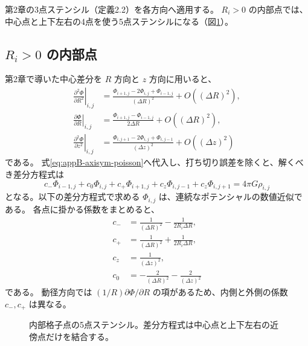 第2章の3点ステンシル（定義2.2）を各方向へ適用する。
$R_i>0$ の内部点では、中心点と上下左右の4点を使う5点ステンシルになる（図\ref{fig:appB-stencil}）。

\subsection{$R_i>0$ の内部点}

第2章で導いた中心差分を $R$ 方向と $z$ 方向に用いると、
\begin{align}
 \left.\frac{\partial^2\Phi}{\partial R^2}\right|_{i,j}&=\frac{\Phi_{i+1,j}-2\Phi_{i,j}+\Phi_{i-1,j}}{(\Delta R)^2}+O((\Delta R)^2),\label{eq:appB-drr}\\
 \left.\frac{\partial\Phi}{\partial R}\right|_{i,j}&=\frac{\Phi_{i+1,j}-\Phi_{i-1,j}}{2\Delta R}+O((\Delta R)^2),\label{eq:appB-dr}\\
 \left.\frac{\partial^2\Phi}{\partial z^2}\right|_{i,j}&=\frac{\Phi_{i,j+1}-2\Phi_{i,j}+\Phi_{i,j-1}}{(\Delta z)^2}+O((\Delta z)^2)\label{eq:appB-dzz}
\end{align}
である。
式\eqref{eq:appB-axisym-poisson}へ代入し、打ち切り誤差を除くと、解くべき差分方程式は
\begin{equation}
 c_-\Phi_{i-1,j}+c_0\Phi_{i,j}+c_+\Phi_{i+1,j}+c_z\Phi_{i,j-1}+c_z\Phi_{i,j+1}=4\pi G\rho_{i,j}
\label{eq:appB-five-point-row}
\end{equation}
となる。以下の差分方程式で求める $\Phi_{i,j}$ は、連続なポテンシャルの数値近似である。
各点に掛かる係数をまとめると、
\begin{align}
 c_-&=\frac{1}{(\Delta R)^2}-\frac{1}{2R_i\Delta R},\label{eq:appB-cm}\\
 c_+&=\frac{1}{(\Delta R)^2}+\frac{1}{2R_i\Delta R},\label{eq:appB-cp}\\
 c_z&=\frac{1}{(\Delta z)^2},\label{eq:appB-cz}\\
 c_0&=-\frac{2}{(\Delta R)^2}-\frac{2}{(\Delta z)^2}\label{eq:appB-c0}
\end{align}
である。
動径方向では $(1/R)\partial\Phi/\partial R$ の項があるため、内側と外側の係数 $c_-,c_+$ は異なる。

\begin{figure}[!htbp]
\centering
{}
\caption{内部格子点の5点ステンシル。差分方程式は中心点と上下左右の近傍点だけを結合する。}
\label{fig:appB-stencil}
\end{figure}

